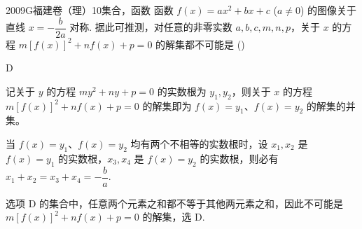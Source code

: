 
\begin{problem}{2009}{G}{福建卷（理）}{10}{集合，函数}
函数 $f(x)=ax^2+bx+c$ ($a\neq0$) 的图像关于直线 $x=-\dfrac{b}{2a}$ 对称. 据此可推测，对任意的非零实数 $a,b,c,m,n,p$，关于 $x$ 的方程 $m[f(x)]^2+nf(x)+p=0$ 的解集都不可能是 (\hspace{1cm})

\begin{choices}
\end{choices}
\end{problem}

\begin{answer}
D
\end{answer}

\begin{solutions}
记关于 $y$ 的方程 $my^2+ny+p=0$ 的实数根为 $y_1,y_2$，则关于 $x$ 的方程 $m[f(x)]^2+nf(x)+p=0$ 的解集即为 $f(x)=y_1$、$f(x)=y_2$ 的解集的并集。

当 $f(x)=y_1$、$f(x)=y_2$ 均有两个不相等的实数根时，设 $x_1,x_2$ 是 $f(x)=y_1$ 的实数根，$x_3,x_4$ 是 $f(x)=y_2$ 的实数根，则必有 $x_1+x_2=x_3+x_4=-\dfrac{b}{a}$.

选项 D 的集合中，任意两个元素之和都不等于其他两元素之和，因此不可能是 $m[f(x)]^2+nf(x)+p=0$ 的解集，选 D.
\end{solutions}